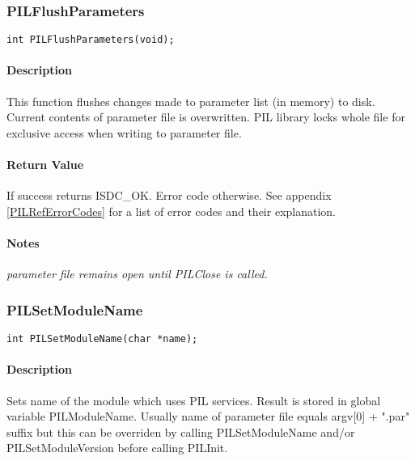 \subsubsection{PILFlushParameters}

\begin{verbatim}
int PILFlushParameters(void);
\end{verbatim}

\paragraph{Description\\}
This function flushes changes made to parameter list (in memory) to disk.
Current contents
of parameter file is overwritten. PIL library locks whole file for exclusive
access when writing to parameter file.

\paragraph{Return Value\\}
If success returns ISDC\_OK. Error code otherwise. See appendix \ref{PILRefErrorCodes}
for a list of error codes and their explanation.

\paragraph{Notes\\}
{\it
parameter file remains open until PILClose is called.
}



\subsubsection{PILSetModuleName}

\begin{verbatim}
int PILSetModuleName(char *name);
\end{verbatim}

\paragraph{Description\\}
Sets name of the module which uses PIL services. Result is stored in global
variable
PILModuleName. Usually name of parameter file equals argv[0] + ".par" suffix
but this can
be overriden by calling PILSetModuleName and/or PILSetModuleVersion before
calling
PILInit. 

